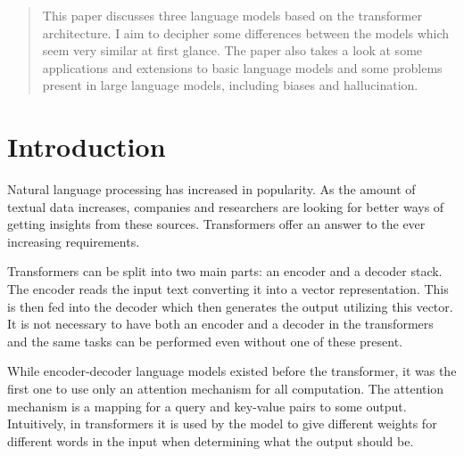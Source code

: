 \documentclass[twoside]{article}
\begin{document}
%

%


\begin{abstract}
  This paper discusses three language models based on the transformer architecture.
  I aim to decipher some differences between the models which seem very similar at first glance.
  The paper also takes a look at some applications and extensions to basic language
  models and some problems present in large language models, including biases
  and hallucination.
\end{abstract}

\section{Introduction}

Natural language processing has increased in popularity. As the amount of textual data
increases, companies and researchers are looking for better ways of getting insights from
these sources. Transformers offer an answer
to the ever increasing requirements.

Transformers can be split into two main parts: an encoder and a decoder stack. 
The encoder reads the input text converting it into a vector representation. This is
then fed into the decoder which then generates the output utilizing this vector.
It is not necessary to have both an encoder and a decoder in the transformers
and the same tasks can be performed even without one of these present. 
\cite{vaswani_attention_2017}

While encoder-decoder language models existed before the transformer, it was 
the first one to use only an attention mechanism for all computation. 
The attention mechanism is a mapping for a query and key-value pairs to some output. 
Intuitively, in transformers
it is used by the model to give different weights for different words in the input when
determining what the output should be. \cite{galassi_attention_2021}
\end{document}
